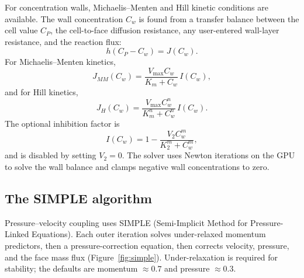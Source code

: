 \documentclass[11pt]{article}
\begin{document}
For concentration walls, Michaelis--Menten and Hill kinetic conditions are available.
The wall concentration \(C_w\) is found from a transfer balance between the cell value
\(C_P\), the cell-to-face diffusion resistance, any user-entered wall-layer resistance,
and the reaction flux:
\begin{equation}
h(C_P - C_w) = J(C_w).
\end{equation}
For Michaelis--Menten kinetics,
\begin{equation}
J_{MM}(C_w)=\frac{V_{\max} C_w}{K_m + C_w}\,I(C_w),
\end{equation}
and for Hill kinetics,
\begin{equation}
J_H(C_w)=\frac{V_{\max} C_w^n}{K_m^n + C_w^n}\,I(C_w).
\end{equation}
The optional inhibition factor is
\begin{equation}
I(C_w)=1-\frac{V_2 C_w^m}{K_2^m + C_w^m},
\end{equation}
and is disabled by setting \(V_2=0\). The solver uses Newton iterations on the GPU to
solve the wall balance and clamps negative wall concentrations to zero.

\subsection{The SIMPLE algorithm}
Pressure--velocity coupling uses SIMPLE (Semi-Implicit Method for Pressure-Linked
Equations). Each outer iteration solves under-relaxed momentum predictors, then a
pressure-correction equation, then corrects velocity, pressure, and the face mass flux
(Figure~\ref{fig:simple}). Under-relaxation is required for stability; the defaults are
momentum \(\approx 0.7\) and pressure \(\approx 0.3\).
\end{document}
